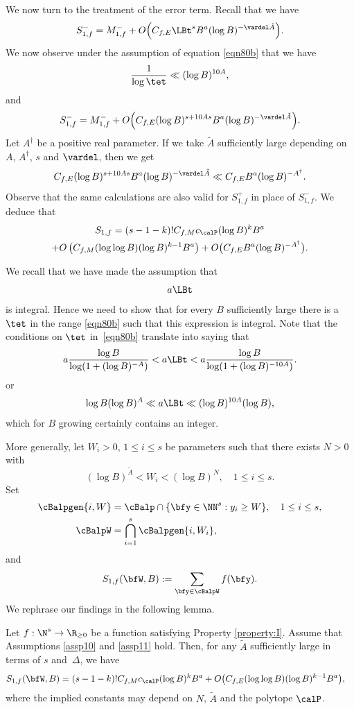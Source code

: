 We now turn to the treatment of the error term. Recall that we have
\[
S_{1,f}^-= M_{1,f}^- + O\Bigl(C_{f,E} \LBt^s B^{a} (\log B)^{-\vardel \tilde{A}}\Bigr).
\]
We now observe under the assumption of equation \eqref{eqn80b} that we have
\[
\frac{1}{\log \tet}\ll (\log B)^{10A},
\]
and
\[
S_{1,f}^-= M_{1,f}^- + O\Bigl(C_{f,E} (\log B)^{s+10As} B^{a} (\log B)^{-\vardel \tilde{A}}\Bigr).
\]
Let $A^\dagger$ be a positive real parameter. If we take $\tilde{A}$ sufficiently large depending on $A$, $A^\dagger$, $s$ and $\vardel$, then we get
\[
C_{f,E} (\log B)^{s+10As} B^{a} (\log B)^{-\vardel \tilde{A}} \ll C_{f,E} B^{a} (\log B)^{-A^\dagger}.
\]
Observe that the same calculations are also valid for $S_{1,f}^+$ in place of $S_{1,f}^-$. We deduce that
\begin{multline*}
S_{1,f}=(s-1-k)! C_{f,M}c_{\calP} (\log B)^kB^{a} \\
+O\left(C_{f,M}(\log \log B) (\log B)^{k-1} B^{a} \right) + O\bigl(C_{f,E} B^{a} (\log B)^{-A^\dagger}\bigr).
\end{multline*}

We recall that we have made the assumption that
\[
a \LBt
\]
is integral. Hence we need to show that for every $B$ sufficiently large there is a $\tet$ in the range \eqref{eqn80b} such that this expression is integral. Note that the conditions on $\tet$ in~\eqref{eqn80b} translate into saying that
\[
a \frac{\log B}{\log(1+(\log B)^{-A})}< a\LBt< a \frac{\log B}{\log (1+(\log B)^{-10A})}.
\]
or
\[
\log B (\log B)^A \ll a \LBt \ll (\log B)^{10A} (\log B),
\]
which for $B$ growing certainly contains an integer.\par

More generally, let $W_i>0$, $1\leq i\leq s$ be parameters such that there exists $N>0$ with
\[
(\log B)^{\tilde{A}}<W_i< (\log B)^N,\quad 1\leq i\leq s.
\]
Set
\begin{align*}
\cBalpgen{i,W}&=\cBalp\cap\{\bfy\in\NN^s: y_i \geq W\},\quad 1\leq i\leq s,\\
\cBalpW&=\bigcap_{i=1}^s\cBalpgen{i,W_i},
\end{align*}
and
\[
S_{1,f}(\bfW,B):= \sum_{\bfy\in\cBalpW}f(\bfy).
\]
We rephrase our findings in the following lemma.
\begin{lemma}\label{lem40}
Let $f: \N^s\rightarrow \R_{\geq 0}$ be a function satisfying Property \ref{property:I}. Assume that Assumptions \ref{assp10} and \ref{assp11} hold. Then, for any $\tilde A$ sufficiently large in terms of $s$ and~$\Delta$, we have
\begin{equation*}
\begin{split}
S_{1,f}(\bfW,B)&=(s-1-k)! C_{f,M}c_{\calP} (\log B)^kB^{a} +O\bigl(C_{f,E}(\log \log B) (\log B)^{k-1} B^{a} \bigr) ,
\end{split}
\end{equation*}
where the implied constants may depend on $N$, $\tilde{A}$ and the polytope $\calP$.
\end{lemma}

